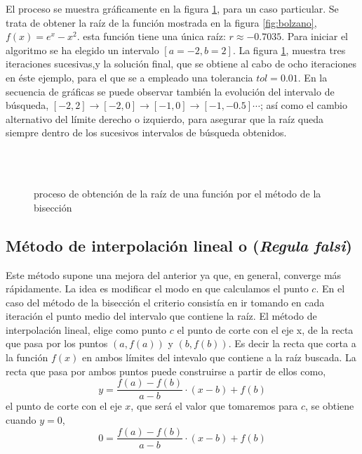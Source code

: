 El proceso se muestra gráficamente en la figura \ref{fig:bisec}, para un caso particular. Se trata de obtener la raíz de la función mostrada en la figura \ref{fig:bolzano}, $f(x)=e^x-x^2$. esta función tiene una única raíz: $r\approx -0.7035$. Para iniciar el algoritmo se ha elegido un intervalo $[a=-2,b=2]$. La figura \ref{fig:bisec}, muestra tres iteraciones sucesivas,y la solución final, que se obtiene al cabo de ocho iteraciones en éste ejemplo, para el que se a empleado una tolerancia $tol=0.01$. En la secuencia de gráficas se puede observar también la evolución del intervalo de búsqueda, $[-2, 2]\rightarrow [-2, 0] \rightarrow [-1, 0] \rightarrow [-1, -0.5] \cdots$; así como el cambio alternativo del límite derecho o izquierdo, para asegurar que la raíz queda siempre dentro de los sucesivos intervalos de búsqueda obtenidos. 
\begin{figure}
\centering
{} \qquad
{}\\
\qquad
{}\\

\caption{proceso de obtención de la raíz de una función por el método de la bisección }
\label{fig:bisec}
\end{figure}

\subsection{Método de interpolación lineal o (\emph{Regula falsi})}
Este método supone una mejora del anterior ya que, en general,  converge más rápidamente. La idea es modificar el modo en que calculamos el punto $c$. En el caso del método de la bisección el criterio consistía en ir tomando en cada iteración el punto medio del intervalo que contiene la raíz. El método de interpolación lineal, elige como punto $c$ el punto de corte con el eje x, de la recta que pasa por los puntos $\left(a,f(a)\right)$ y $\left(b,f(b)\right)$. Es decir la recta que corta a la función $f(x)$ en ambos límites del intevalo que contiene a la raíz buscada. La recta que pasa por ambos puntos puede construirse a partir de ellos como,
\begin{equation*}
y=\frac{f(a)-f(b)}{a-b}\cdot(x-b)+f(b)
\end{equation*}
el punto de corte con el eje $x$, que será el valor que tomaremos para $c$, se obtiene cuando $y=0$,
\begin{equation*}
0=\frac{f(a)-f(b)}{a-b}\cdot(x-b)+f(b)
\end{equation*}

